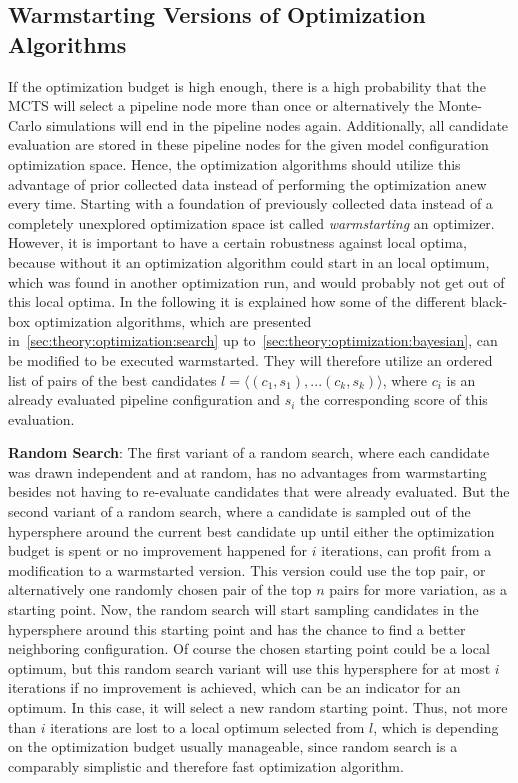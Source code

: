 \subsection{Warmstarting Versions of Optimization Algorithms}
\label{sec:appraoch:configuration:warmstart}
If the optimization budget is high enough, there is a high probability that the MCTS will select a pipeline node more than once or alternatively the Monte-Carlo simulations will end in the pipeline nodes again.
Additionally, all candidate evaluation are stored in these pipeline nodes for the given model configuration optimization space.
Hence, the optimization algorithms should utilize this advantage of prior collected data instead of performing the optimization anew every time.\newline
Starting with a foundation of previously collected data instead of a completely unexplored optimization space ist called \textit{warmstarting} an optimizer.
However, it is important to have a certain robustness against local optima, because without it an optimization algorithm could start in an local optimum, which was found in another optimization run, and would probably not get out of this local optima.
In the following it is explained how some of the different black-box optimization algorithms, which are presented in~\ref{sec:theory:optimization:search} up to~\ref{sec:theory:optimization:bayesian}, can be modified to be executed warmstarted.
They will therefore utilize an ordered list of pairs of the best candidates $l = \langle (c_1, s_1), ... (c_k, s_k) \rangle$, where $c_i$ is an already evaluated pipeline configuration and $s_i$ the corresponding score of this evaluation.

\textbf{Random Search}:
The first variant of a random search, where each candidate was drawn independent and at random, has no advantages from warmstarting besides not having to re-evaluate candidates that were already evaluated.\newline
But the second variant of a random search, where a candidate is sampled out of the hypersphere around the current best candidate up until either the optimization budget is spent or no improvement happened for $i$ iterations, can profit from a modification to a warmstarted version.
This version could use the top pair, or alternatively one randomly chosen pair of the top $n$ pairs for more variation, as a starting point.
Now, the random search will start sampling candidates in the hypersphere around this starting point and has the chance to find a better neighboring configuration.\newline
Of course the chosen starting point could be a local optimum, but this random search variant will use this hypersphere for at most $i$ iterations if no improvement is achieved, which can be an indicator for an optimum.
In this case, it will select a new random starting point.
Thus, not more than $i$ iterations are lost to a local optimum selected from $l$, which is depending on the optimization budget usually manageable, since random search is a comparably simplistic and therefore fast optimization algorithm.

